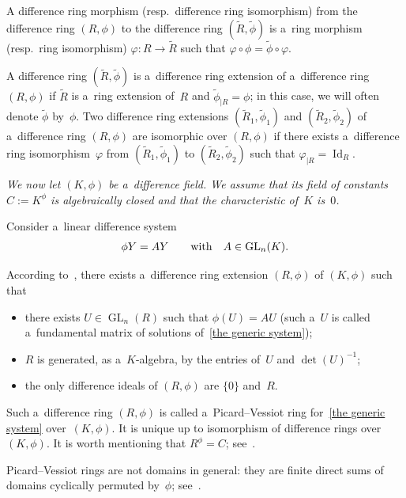 \documentclass[10pt,a4paper]{amsart}
\numberwithin{equation}{section}
\begin{document}
A dif\/ference ring morphism (resp.\
dif\/ference ring isomorphism) from the dif\/ference ring $(R,\phi)$ to the dif\/ference ring
$(\widetilde{R},\widetilde{\phi})$ is a~ring morphism (resp.\
ring isomorphism) $\varphi: R \rightarrow \widetilde{R}$ such that $\varphi \circ \phi = \widetilde{\phi} \circ
\varphi$.

A dif\/ference ring $(\widetilde{R},\widetilde{\phi})$ is a~dif\/ference ring extension of a~dif\/ference ring $(R,\phi)$ if
$\widetilde{R}$ is a~ring extension of~$R$ and $\widetilde{\phi}_{\vert R}=\phi$; in this case, we will often denote
$\widetilde{\phi}$ by~$\phi$.
Two dif\/ference ring extensions $(\widetilde{R}_{1},\widetilde{\phi}_{1})$ and $(\widetilde{R}_{2},\widetilde{\phi}_{2})$
of a~dif\/ference ring $(R,\phi)$ are isomorphic over $(R,\phi)$ if there exists a~dif\/ference ring isomorphism~$\varphi$
from $(\widetilde{R}_{1},\widetilde{\phi}_{1})$ to $(\widetilde{R}_{2},\widetilde{\phi}_{2})$ such that $\varphi_{\vert
R}=\operatorname{Id}_{R}$.

{\it We now let $(K,\phi)$ be a~difference field.
We assume that its field of constants $C:=K^{\phi}$ is algebraically closed and that the characteristic of~$K$ is~$0$.}

Consider a~linear dif\/ference system
\begin{gather}
\label{the generic system}
\phi Y=AY \qquad \hbox{with} \quad A \in \operatorname{GL}_{n}(K).
\end{gather}

According to~\cite[Section~1.1]{VdPS97}, there exists a~dif\/ference ring extension $(R,\phi)$ of $(K,\phi)$ such that
\begin{itemize}\itemsep=0pt
\item[1)] there exists $U \in \operatorname{GL}_{n}(R)$ such that $\phi (U) = AU$ (such a~$U$ is called a~fundamental
matrix of solutions of~\eqref{the generic system});
\item[2)] $R$ is generated, as a~$K$-algebra, by the entries of~$U$ and $\det(U)^{-1}$;
\item[3)] the only dif\/ference ideals of $(R,\phi)$ are $\{0\}$ and~$R$.
\end{itemize}
Such a~dif\/ference ring $(R,\phi)$ is called a~Picard--Vessiot ring for~\eqref{the generic system} over~$(K,\phi)$.
It is unique up to isomorphism of dif\/ference rings over $(K,\phi)$.
It is worth mentioning that $R^{\phi}=C$; see~\cite[Lemma~1.8]{VdPS97}.
\begin{Remark}
Picard--Vessiot rings are not domains in general: they are f\/inite direct sums of domains cyclically permuted by~$\phi$;
see~\cite[Corollary~1.16]{VdPS97}.
\end{Remark}
\end{document}
